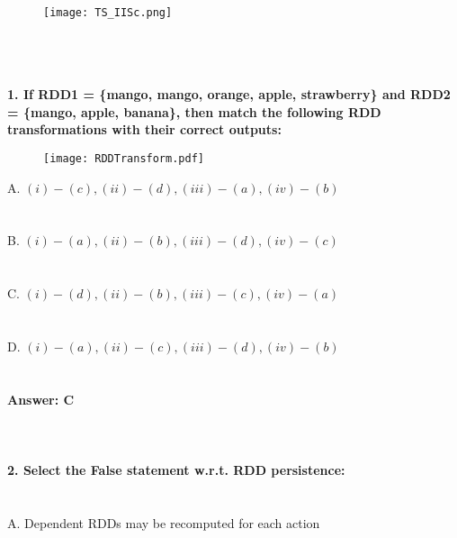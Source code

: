 \documentclass[prl,twocolumn,showpacs,preprintnumbers,superscriptaddress]{revtex4}
\theoremstyle{plain}
\theoremstyle{definition}
\begin{document}
\begin{widetext}
\\
\\
\\

\begin{wrapfigure}
\centering
\end{wrapfigure}
\begin{figure}[h!]
 \begin{right}
  \hfill\texttt{[image: TS\_IISc.png]}
 \end{right}
\end{figure}
\\
\\
\\
\noindent\textbf{1. If RDD1 = \{mango, mango, orange, apple, strawberry\} and RDD2 = \{mango, apple, banana\}, then match the following RDD transformations with their correct outputs:
}
\begin{figure}[H]
\begin{center}
    \texttt{[image: RDDTransform.pdf]}
\end{center}
\end{figure}
\noindent A. $(i) - (c), (ii) - (d), (iii) - (a), (iv) - (b)$ 
\\
\\
\\
B. $(i) - (a), (ii) - (b), (iii) - (d), (iv) - (c)$
\\
\\
\\
C. $(i) - (d), (ii) - (b), (iii) - (c), (iv) - (a)$
\\
\\
\\
D. $(i) - (a), (ii) - (c), (iii) - (d), (iv) - (b)$
\\
\\
\\
\textbf{Answer: C}
\\
\\
\\
\\
\textbf{2. Select the False statement w.r.t. RDD persistence:}
\\
\\
\\
\noindent A. Dependent RDDs may be recomputed for each action\\
\\
\\

\end{widetext}
\end{document}
